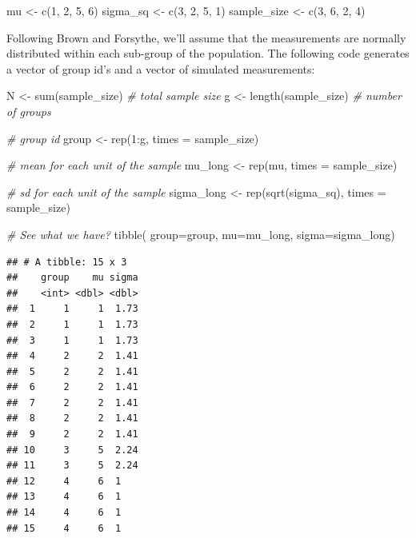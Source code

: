 \documentclass[
]{book}
\newenvironment{Shaded}{\begin{snugshade}}{\end{snugshade}}
\newcommand{\AttributeTok}[1]{\textcolor[rgb]{0.77,0.63,0.00}{#1}}
\newcommand{\CommentTok}[1]{\textcolor[rgb]{0.56,0.35,0.01}{\textit{#1}}}
\newcommand{\DecValTok}[1]{\textcolor[rgb]{0.00,0.00,0.81}{#1}}
\newcommand{\FunctionTok}[1]{\textcolor[rgb]{0.00,0.00,0.00}{#1}}
\newcommand{\NormalTok}[1]{#1}
\newcommand{\OtherTok}[1]{\textcolor[rgb]{0.56,0.35,0.01}{#1}}
\newcommand{\SpecialCharTok}[1]{\textcolor[rgb]{0.00,0.00,0.00}{#1}}
\begin{document}
\begin{Shaded}
\begin{Highlighting}[]
\NormalTok{mu }\OtherTok{\textless{}{-}} \FunctionTok{c}\NormalTok{(}\DecValTok{1}\NormalTok{, }\DecValTok{2}\NormalTok{, }\DecValTok{5}\NormalTok{, }\DecValTok{6}\NormalTok{)}
\NormalTok{sigma\_sq }\OtherTok{\textless{}{-}} \FunctionTok{c}\NormalTok{(}\DecValTok{3}\NormalTok{, }\DecValTok{2}\NormalTok{, }\DecValTok{5}\NormalTok{, }\DecValTok{1}\NormalTok{)}
\NormalTok{sample\_size }\OtherTok{\textless{}{-}} \FunctionTok{c}\NormalTok{(}\DecValTok{3}\NormalTok{, }\DecValTok{6}\NormalTok{, }\DecValTok{2}\NormalTok{, }\DecValTok{4}\NormalTok{)}
\end{Highlighting}
\end{Shaded}

Following Brown and Forsythe, we'll assume that the measurements are normally distributed within each sub-group of the population. The following code generates a vector of group id's and a vector of simulated measurements:

\begin{Shaded}
\begin{Highlighting}[]
\NormalTok{N }\OtherTok{\textless{}{-}} \FunctionTok{sum}\NormalTok{(sample\_size) }\CommentTok{\# total sample size}
\NormalTok{g }\OtherTok{\textless{}{-}} \FunctionTok{length}\NormalTok{(sample\_size) }\CommentTok{\# number of groups}

\CommentTok{\# group id}
\NormalTok{group }\OtherTok{\textless{}{-}} \FunctionTok{rep}\NormalTok{(}\DecValTok{1}\SpecialCharTok{:}\NormalTok{g, }\AttributeTok{times =}\NormalTok{ sample\_size)}

\CommentTok{\# mean for each unit of the sample}
\NormalTok{mu\_long }\OtherTok{\textless{}{-}} \FunctionTok{rep}\NormalTok{(mu, }\AttributeTok{times =}\NormalTok{ sample\_size) }

\CommentTok{\# sd for each unit of the sample}
\NormalTok{sigma\_long }\OtherTok{\textless{}{-}} \FunctionTok{rep}\NormalTok{(}\FunctionTok{sqrt}\NormalTok{(sigma\_sq), }\AttributeTok{times =}\NormalTok{ sample\_size) }

\CommentTok{\# See what we have?}
\FunctionTok{tibble}\NormalTok{( }\AttributeTok{group=}\NormalTok{group, }\AttributeTok{mu=}\NormalTok{mu\_long, }\AttributeTok{sigma=}\NormalTok{sigma\_long)}
\end{Highlighting}
\end{Shaded}

\begin{verbatim}
## # A tibble: 15 x 3
##    group    mu sigma
##    <int> <dbl> <dbl>
##  1     1     1  1.73
##  2     1     1  1.73
##  3     1     1  1.73
##  4     2     2  1.41
##  5     2     2  1.41
##  6     2     2  1.41
##  7     2     2  1.41
##  8     2     2  1.41
##  9     2     2  1.41
## 10     3     5  2.24
## 11     3     5  2.24
## 12     4     6  1   
## 13     4     6  1   
## 14     4     6  1   
## 15     4     6  1
\end{verbatim}
\end{document}
